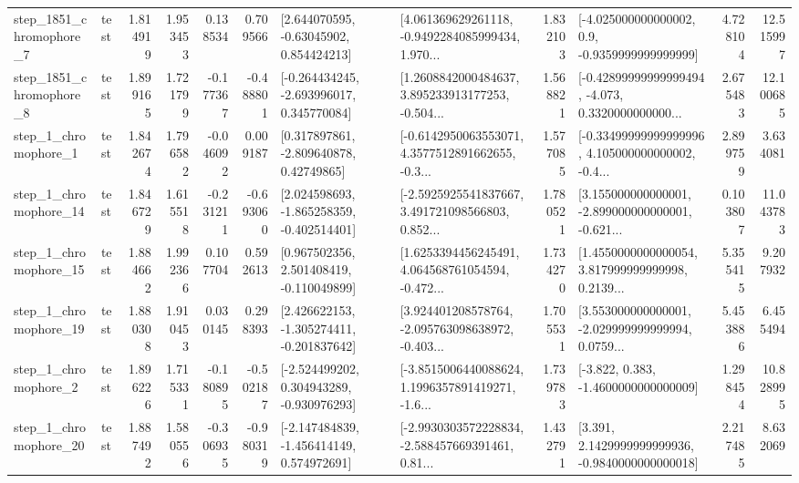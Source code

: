 \begin{tabular}{llrrrrllrlrr}
  step\_1851\_chromophore\_7 &      test &      1.814919 &    1.953453 &      0.138534 &  0.709566 &     [2.644070595, -0.63045902, 0.854424213] &  [4.061369629261118, -0.9492284085999434, 1.970... &       1.832103 &     [-4.025000000000002, 0.9, -0.9359999999999999] &            4.728104 &         12.515997 \\
  step\_1851\_chromophore\_8 &      test &      1.899165 &    1.721799 &     -0.177367 & -0.488801 &   [-0.264434245, -2.693996017, 0.345770084] &  [1.2608842000484637, 3.895233913177253, -0.504... &       1.568821 &  [-0.42899999999999494, -4.073, 0.3320000000000... &            2.675483 &         12.100685 \\
     step\_1\_chromophore\_1 &      test &      1.842674 &    1.796582 &     -0.046092 &  0.009187 &     [0.317897861, -2.809640878, 0.42749865] &  [-0.6142950063553071, 4.3577512891662655, -0.3... &       1.577085 &  [-0.33499999999999996, 4.105000000000002, -0.4... &            2.899759 &          3.634081 \\
    step\_1\_chromophore\_14 &      test &      1.846729 &    1.615518 &     -0.231211 & -0.693060 &   [2.024598693, -1.865258359, -0.402514401] &  [-2.5925925541837667, 3.491721098566803, 0.852... &       1.780521 &  [3.155000000000001, -2.899000000000001, -0.621... &            0.103807 &         11.043783 \\
    step\_1\_chromophore\_15 &      test &      1.884662 &    1.992366 &      0.107704 &  0.592613 &    [0.967502356, 2.501408419, -0.110049899] &  [1.6253394456245491, 4.064568761054594, -0.472... &       1.734270 &  [1.4550000000000054, 3.817999999999998, 0.2139... &            5.355415 &          9.207932 \\
    step\_1\_chromophore\_19 &      test &      1.880308 &    1.910453 &      0.030145 &  0.298393 &   [2.426622153, -1.305274411, -0.201837642] &  [3.924401208578764, -2.095763098638972, -0.403... &       1.705531 &  [3.553000000000001, -2.029999999999994, 0.0759... &            5.453886 &          6.455494 \\
     step\_1\_chromophore\_2 &      test &      1.896226 &    1.715331 &     -0.180895 & -0.502187 &   [-2.524499202, 0.304943289, -0.930976293] &  [-3.8515006440088624, 1.1996357891419271, -1.6... &       1.739783 &               [-3.822, 0.383, -1.4600000000000009] &            1.298454 &         10.828995 \\
    step\_1\_chromophore\_20 &      test &      1.887492 &    1.580556 &     -0.306935 & -0.980319 &   [-2.147484839, -1.456414149, 0.574972691] &  [-2.9930303572228834, -2.588457669391461, 0.81... &       1.432791 &   [3.391, 2.1429999999999936, -0.9840000000000018] &            2.217485 &          8.632069 \\

\end{tabular}
